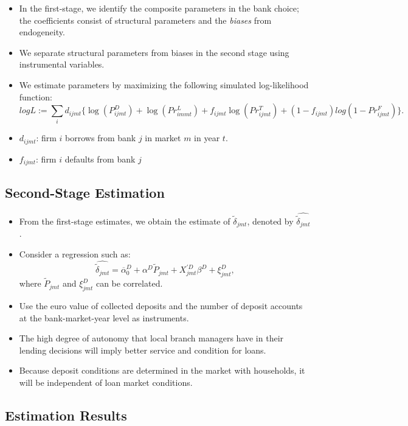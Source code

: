 \documentclass[
]{book}
\providecommand{\tightlist}{%
  \setlength{\itemsep}{0pt}\setlength{\parskip}{0pt}}
\begin{document}
\begin{itemize}
\tightlist
\item
  In the first-stage, we identify the composite parameters in the bank choice; the coefficients consist of structural parameters and the \emph{biases} from endogeneity.
\item
  We separate structural parameters from biases in the second stage using instrumental variables.
\item
  We estimate parameters by maximizing the following simulated log-likelihood function:
  \[
  log L := \sum_{i} d_{ijmt} \{\log(P_{ijmt}^D) + \log (Pr_{immt}^L) + f_{ijmt} \log (Pr_{ijmt}^T) + (1 - f_{ijmt}) log (1 - Pr_{ijmt}^F) \}.
  \]
\item
  \(d_{ijmt}\): firm \(i\) borrows from bank \(j\) in market \(m\) in year \(t\).
\item
  \(f_{ijmt}\): firm \(i\) defaults from bank \(j\)
\end{itemize}

\hypertarget{second-stage-estimation}{%
\subsection{Second-Stage Estimation}\label{second-stage-estimation}}

\begin{itemize}
\tightlist
\item
  From the first-stage estimates, we obtain the estimate of \(\tilde{\delta}_{jmt}\), denoted by \(\hat{\tilde{\delta}_{jmt}}\).
\item
  Consider a regression such as:
  \[
  \hat{\tilde{\delta}_{jmt}} = \overline{\alpha}_0^D + \alpha^D \tilde{P}_{jmt} + X_{jmt}^{\prime D} \beta^D + \xi_{jmt}^D,
  \]
  where \(\tilde{P}_{jmt}\) and \(\xi_{jmt}^D\) can be correlated.
\item
  Use the euro value of collected deposits and the number of deposit accounts at the bank-market-year level as instruments.
\item
  The high degree of autonomy that local branch managers have in their lending decisions will imply better service and condition for loans.
\item
  Because deposit conditions are determined in the market with households, it will be independent of loan market conditions.
\end{itemize}

\hypertarget{estimation-results}{%
\subsection{Estimation Results}\label{estimation-results}}
\end{document}
